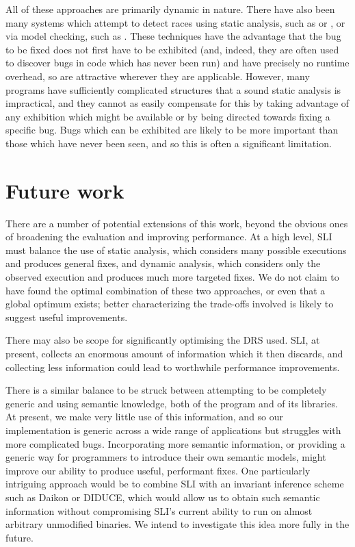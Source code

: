 \documentclass[10pt,letter,twocolumn]{sigplanconf}
\newcommand{\editorial}[1]{}
\begin{document}
All of these approaches are primarily dynamic in nature.  There have
also been many systems which attempt to detect races using static
analysis, such as \cite{Pratikakis2006} or \cite{Engler2003}, or via
model checking, such as \cite{Elmas06preciserace}.  These techniques
have the advantage that the bug to be fixed does not first have to be
exhibited (and, indeed, they are often used to discover bugs in code
which has never been run) and have precisely no runtime overhead, so
are attractive wherever they are applicable.  However, many programs
have sufficiently complicated structures that a sound static analysis
is impractical, and they cannot as easily compensate for this by
taking advantage of any exhibition which might be available or by
being directed towards fixing a specific bug.  Bugs which can be
exhibited are likely to be more important than those which have never
been seen, and so this is often a significant
limitation. \editorial{...}

\section{Future work}

There are a number of potential extensions of this work, beyond the
obvious ones of broadening the evaluation and improving performance.
At a high level, SLI must balance the use of static analysis, which
considers many possible executions and produces general fixes, and
dynamic analysis, which considers only the observed execution and
produces much more targeted fixes.  We do not claim to have found the
optimal combination of these two approaches, or even that a global
optimum exists; better characterizing the trade-offs involved is
likely to suggest useful improvements.

There may also be scope for significantly optimising the DRS used.
SLI, at present, collects an enormous amount of information which it
then discards, and collecting less information could lead to
worthwhile performance improvements.

There is a similar balance to be struck between attempting to be
completely generic and using semantic knowledge, both of the program
and of its libraries.  At present, we make very little use of this
information, and so our implementation is generic across a wide range
of applications but struggles with more complicated bugs.
Incorporating more semantic information, or providing a generic way
for programmers to introduce their own semantic models, might improve
our ability to produce useful, performant fixes.  One particularly
intriguing approach would be to combine SLI with an invariant
inference scheme such as Daikon\cite{Ernst2007} or
DIDUCE\cite{Hangal2002}, which would allow us to obtain such semantic
information without compromising SLI's current ability to run on
almost arbitrary unmodified binaries.  We intend to investigate this
idea more fully in the future.
\end{document}
